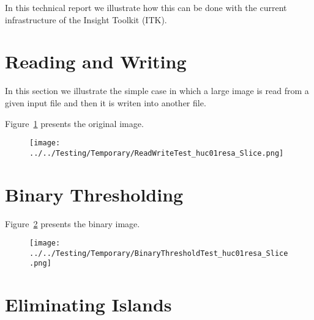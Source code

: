 \documentclass{InsightArticle}
\begin{document}
In this technical report we illustrate how this can be done with the current
infrastructure of the Insight Toolkit (ITK).

\section{Reading and Writing}

In this section we illustrate the simple case in which a large image is read
from a given input file and then it is writen into another file.

\begin{center}

\end{center}

Figure~\ref{fig:OriginalImage} presents the original image.

\begin{figure}
\center
\texttt{[image: ../../Testing/Temporary/ReadWriteTest\_huc01resa\_Slice.png]}
\label{fig:OriginalImage}
\end{figure}



\section{Binary Thresholding}

\begin{center}

\end{center}

Figure~\ref{fig:BinaryImage} presents the binary image.

\begin{figure}
\center
\texttt{[image: ../../Testing/Temporary/BinaryThresholdTest\_huc01resa\_Slice.png]}
\label{fig:BinaryImage}
\end{figure}



\section{Eliminating Islands}

\begin{center}

\end{center}
\end{document}
